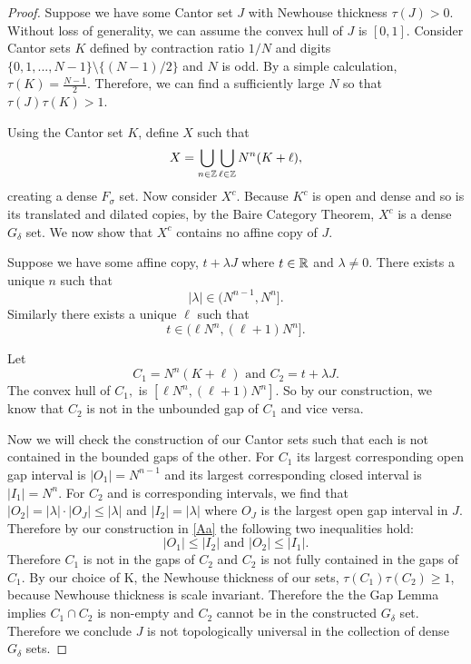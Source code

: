 \begin{proof} Suppose we have some Cantor set $J$ with Newhouse thickness $\tau(J) >0$. Without loss of generality, we  can assume  the convex hull of $J$ is  $[0,1]$.   Consider Cantor sets $K$ defined by contraction ratio $1/N$ and digits $\{0,1,...,N-1\}\setminus\{(N-1)/2\}$ and $N$ is odd. By a simple calculation,  $\tau (K) = \frac{N-1}{2}$. Therefore,  we can find a  sufficiently large $N$ so that $\tau(J)\tau(K)>1$. 

\medskip

Using the Cantor set $K$, define $X$ such that 
\begin{equation}\label{cantorCompliment}
    X = \bigcup_{n \in \mathbb{Z}} \bigcup_{\ell \in \mathbb{Z}} N^n(K+\ell),    
\end{equation}
creating a dense $F_\sigma$ set. Now consider $X^c$.  Because $K^c$ is open and dense and so is its translated and dilated copies, by the Baire Category Theorem, $X^c$ is a dense $G_{\delta}$ set.  We now show that $X^c$ contains no affine copy of $J$. 

\medskip

Suppose we have some affine copy, $t+ \lambda J$ where $t\in\mathbb{R}$ and $\lambda\ne 0$. There exists a unique $n$ such that 
\begin{equation}\label{Aa}
    |\lambda| \in (N^{n-1}, N^n].
\end{equation}
Similarly there exists a unique $\ell$ such that 
\begin{equation}\label{Bb}
t \in (\ell  N^n, (\ell+1)N^n].    
\end{equation}


Let 
$$C_1 = N^n(K+\ell) \text{ and } C_2 = t+ \lambda J.$$
The convex hull of $C_1,$ is  $[\ell  N^n, (\ell+1)N^n]$.  So by our construction, we know that $C_2$ is not in the unbounded gap of $C_1$ and vice versa.  

Now we will check the construction of our Cantor sets such that each is not contained in the bounded gaps of the other. For $C_1$ its largest corresponding open gap interval is $|O_1| = N^{n-1}$ and its largest corresponding closed interval is $|I_1| = N^n$. For $C_2$ and is corresponding intervals, we find that $|O_2| =|\lambda|\cdot |O_J| \le |\lambda|$ and $|I_2| = |\lambda|$ where $O_J$ is the largest  open gap interval in $J$.  Therefore by our construction in \ref{Aa} the following two inequalities hold: $$|O_1|\leq |I_2| \text { and } |O_2| \leq |I_1|.$$ Therefore $C_1$ is not in the gaps of $C_2$ and $C_2$ is not fully contained in the gaps of $C_1$.  By our choice of K, the Newhouse thickness of our sets, $\tau(C_1)\tau(C_2) \geq 1$, because Newhouse thickness is scale invariant.  Therefore the the Gap Lemma implies $C_1 \cap C_2$ is non-empty and $C_2$ cannot be in the constructed $G_{\delta} $ set. Therefore we conclude $J$ is not topologically universal in the collection of dense $G_\delta$ sets.  \end{proof}

